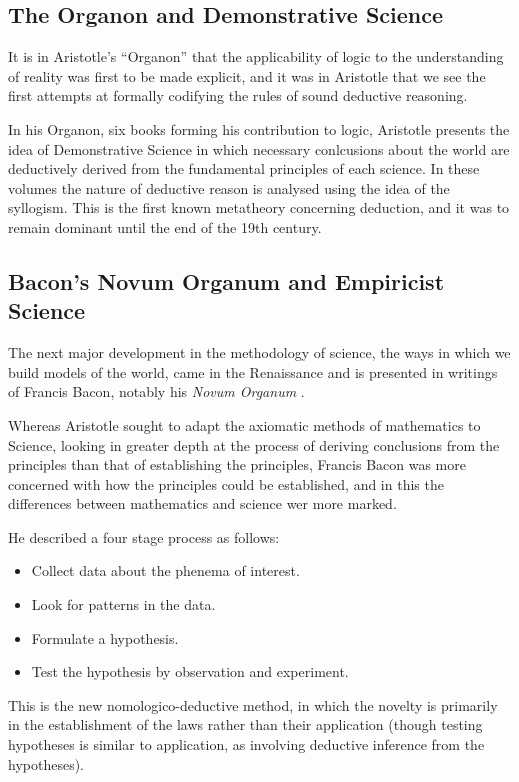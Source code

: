 \documentclass[10pt,titlepage]{book}
\begin{document}
\subsection{The Organon and Demonstrative Science}

It is in Aristotle's ``Organon'' \cite{aristotleL325,aristotleL391} that the applicability of logic to the understanding of reality was first to be made explicit, and it was in Aristotle that we see the first attempts at formally codifying the rules of sound deductive reasoning.

In his Organon, six books forming his contribution to logic, Aristotle presents the idea of Demonstrative Science in which necessary conlcusions about the world are deductively derived from the fundamental principles of each science.
In these volumes the nature of deductive reason is analysed using the idea of the syllogism.
This is the first known metatheory concerning deduction, and it was to remain dominant until the end of the 19th century.

\subsection{Bacon's Novum Organum and Empiricist Science}

The next major development in the methodology of science, the ways in which we build models of the world, came in the Renaissance and is presented in writings of Francis Bacon, notably his \emph{Novum Organum} \cite{bacon2017novum}.

Whereas Aristotle sought to adapt the axiomatic methods of mathematics to Science, looking in greater depth at the process of deriving conclusions from the principles than that of establishing the principles, Francis Bacon was more concerned with how the principles could be established, and in this the differences between mathematics and science wer more marked.

He described a four stage process as follows:

\begin{itemize}
\item Collect data about the phenema of interest.
\item Look for patterns in the data.
\item Formulate a hypothesis.
\item Test the hypothesis by observation and experiment.
\end{itemize}

This is the new nomologico-deductive method, in which the novelty is primarily in the establishment of the laws rather than their application (though testing hypotheses is similar to application, as involving deductive inference from the hypotheses).
\end{document}
